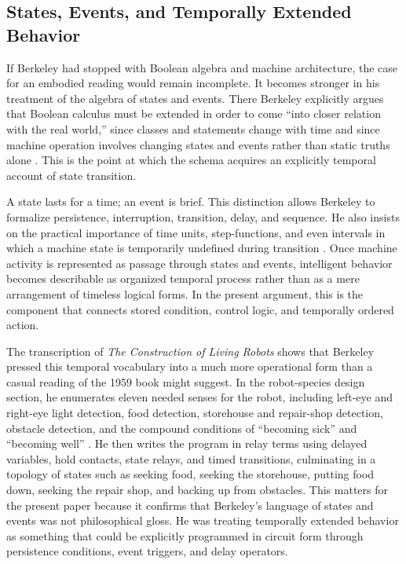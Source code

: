 \documentclass[11pt]{article}
\begin{document}
\subsection*{States, Events, and Temporally Extended Behavior}

If Berkeley had stopped with Boolean algebra and machine architecture, the case for an embodied reading would remain incomplete. It becomes stronger in his treatment of the algebra of states and events. There Berkeley explicitly argues that Boolean calculus must be extended in order to come ``into closer relation with the real world,'' since classes and statements change with time and since machine operation involves changing states and events rather than static truths alone \citep[pp.~145--147]{berkeley1959symbolic}. This is the point at which the schema acquires an explicitly temporal account of state transition.

A state lasts for a time; an event is brief. This distinction allows Berkeley to formalize persistence, interruption, transition, delay, and sequence. He also insists on the practical importance of time units, step-functions, and even intervals in which a machine state is temporarily undefined during transition \citep[pp.~145--147]{berkeley1959symbolic}. Once machine activity is represented as passage through states and events, intelligent behavior becomes describable as organized temporal process rather than as a mere arrangement of timeless logical forms. In the present argument, this is the component that connects stored condition, control logic, and temporally ordered action.

The transcription of \emph{The Construction of Living Robots} shows that Berkeley pressed this temporal vocabulary into a much more operational form than a casual reading of the 1959 book might suggest. In the robot-species design section, he enumerates eleven needed senses for the robot, including left-eye and right-eye light detection, food detection, storehouse and repair-shop detection, obstacle detection, and the compound conditions of ``becoming sick'' and ``becoming well'' \citep{berkeley1952livingrobots}. He then writes the program in relay terms using delayed variables, hold contacts, state relays, and timed transitions, culminating in a topology of states such as seeking food, seeking the storehouse, putting food down, seeking the repair shop, and backing up from obstacles. This matters for the present paper because it confirms that Berkeley's language of states and events was not philosophical gloss. He was treating temporally extended behavior as something that could be explicitly programmed in circuit form through persistence conditions, event triggers, and delay operators.
\end{document}
